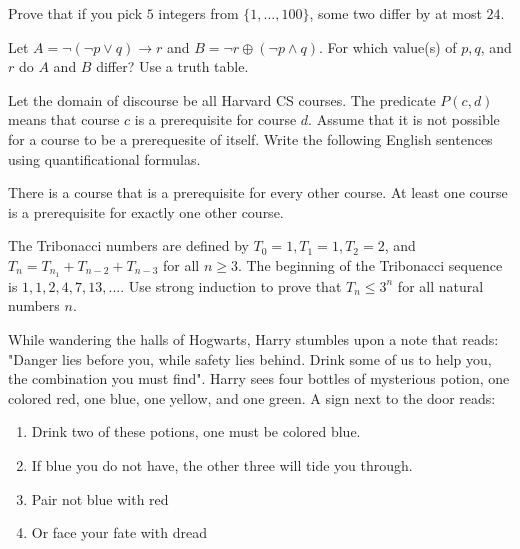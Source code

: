 \documentclass[solution, letterpaper]{cs20exam}
\begin{document}

\problem{}{} Prove that if you pick $5$ integers from $\{1, \ldots, 100\}$, some two differ by at most $24$.

\begin{solution}
\end{solution}

\problem{}{} Let $A = \neg (\neg p \lor q) \to r$ and $B = \neg r \oplus (\neg p \land q)$. For which value(s) of $p, q$, and $r$ do $A$ and $B$ differ? Use a truth table.

\begin{solution}
\end{solution}

\problem{}{} Let the domain of discourse be all Harvard CS courses. The predicate $P(c, d)$ means that course $c$ is a prerequisite for course $d$. Assume that it is not possible for a course to be a prerequesite of itself. Write the following English sentences using quantificational formulas.

\subproblem There is a course that is a prerequisite for every other course.
\subproblem At least one course is a prerequisite for exactly one other course.

\begin{solution}
\end{solution}

\problem{}{} The Tribonacci numbers are defined by $T_0 = 1, T_1 = 1, T_2 = 2$, and $T_n = T_{n_1} + T_{n-2} + T_{n-3}$ for all $n \ge 3$. The beginning of the Tribonacci sequence is $1, 1, 2, 4, 7, 13, ...$. Use strong induction to prove that $T_n \le 3^n$ for all natural numbers $n$.

\begin{solution}
\end{solution}

\problem{}{}

While wandering the halls of Hogwarts, Harry stumbles upon a note that reads: "Danger lies before you, while safety lies behind. Drink some of us to help you, the combination you must find". Harry sees four bottles of mysterious potion, one colored red, one blue, one yellow, and one green. A sign next to the door reads:

\begin{enumerate}
\item Drink two of these potions, one must be colored blue.
\item If blue you do not have, the other three will tide you through.
\item Pair not blue with red
\item Or face your fate with dread
\end{enumerate}
\end{document}
